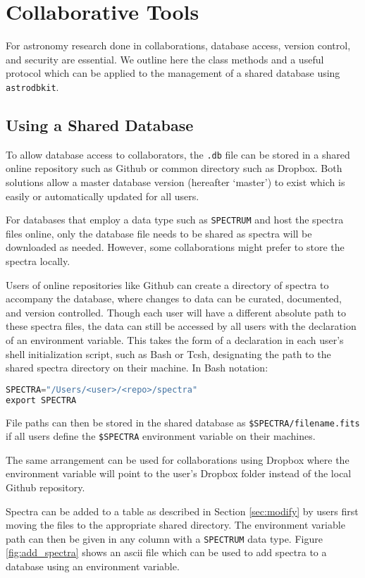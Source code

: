 \documentclass[iop,revtex4,natbib209]{emulateapj}
\begin{document}
\section{Collaborative Tools}{\label{sec:collaborate}}
For astronomy research done in collaborations, database access, version control, and security are essential. We outline here the class methods and a useful protocol which can be applied to the management of a shared database using \texttt{astrodbkit}.

\subsection{Using a Shared Database}{\label{sec:use_shared}}
To allow database access to collaborators, the \texttt{.db} file can be stored in a shared online repository such as Github or common directory such as Dropbox. Both solutions allow a master database version (hereafter `master') to exist which is easily or automatically updated for all users.

For databases that employ a data type such as \texttt{SPECTRUM} and host the spectra files online, only the database file needs to be shared as spectra will be downloaded as needed. However, some collaborations might prefer to store the spectra locally. 

Users of online repositories like Github can create a directory of spectra to accompany the database, where changes to data can be curated, documented, and version controlled. Though each user will have a different absolute path to these spectra files, the data can still be accessed by all users with the declaration of an environment variable. This takes the form of a declaration in each user's shell initialization script, such as Bash or Tcsh, designating the path to the shared spectra directory on their machine. In Bash notation:

\begin{lstlisting}[language=Python]
SPECTRA="/Users/<user>/<repo>/spectra"
export SPECTRA
\end{lstlisting}

File paths can then be stored in the shared database as \texttt{\$SPECTRA/filename.fits} if all users define the \texttt{\$SPECTRA} environment variable on their machines.

The same arrangement can be used for collaborations using Dropbox where the environment variable will point to the user's Dropbox folder instead of the local Github repository.

Spectra can be added to a table as described in Section \ref{sec:modify} by users first moving the files to the appropriate shared directory. The environment variable path can then be given in any column with a \texttt{SPECTRUM} data type. Figure \ref{fig:add_spectra} shows an ascii file which can be used to add spectra to a database using an environment variable.
\end{document}
